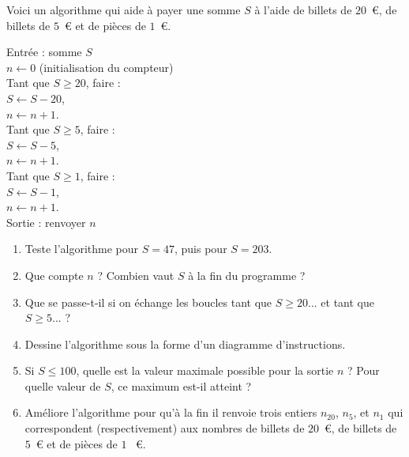 \documentclass[class=report,crop=false, 12pt]{standalone}
\begin{document}
\begin{activite}
Voici un algorithme qui aide à payer une somme $S$ à l'aide de billets de $20$~€, de billets de $5$~€ et de pièces de $1$~€.


\begin{center}
\begin{minipage}{0.6\textwidth}
Entrée : somme $S$ \\
$n \leftarrow 0$ (initialisation du compteur) \\
Tant que $S \ge 20$, faire :\\
\indentation $S \leftarrow S - 20$, \\
\indentation $n \leftarrow n + 1$. \\
Tant que $S \ge 5$, faire :\\
\indentation $S \leftarrow S - 5$, \\
\indentation $n \leftarrow n + 1$. \\
Tant que $S \ge 1$, faire :\\
\indentation $S \leftarrow S - 1$, \\
\indentation $n \leftarrow n + 1$. \\
Sortie : renvoyer $n$
\end{minipage}
\end{center}

\begin{enumerate}
  \item Teste l'algorithme pour $S = 47$, puis pour $S = 203$.
  
  \item Que compte $n$ ? Combien vaut $S$ à la fin du programme ?
  
  \item Que se passe-t-il si on échange les boucles \og tant que $S \ge 20$... \fg{} et \og tant que $S \ge 5$... \fg{} ?
  
  \item Dessine l'algorithme sous la forme d'un diagramme d'instructions.
  
  \item Si $S \le 100$, quelle est la valeur maximale possible pour la sortie $n$ ? Pour quelle valeur de $S$, ce maximum est-il atteint ?
  
  \item Améliore l'algorithme pour qu'à la fin il renvoie trois entiers $n_{20}$, $n_5$, et $n_1$ qui correspondent (respectivement) aux nombres de billets de $20$~€, de billets de $5$~€ et de pièces de $1$~ €. 
  
\end{enumerate}
\end{activite}
\end{document}
